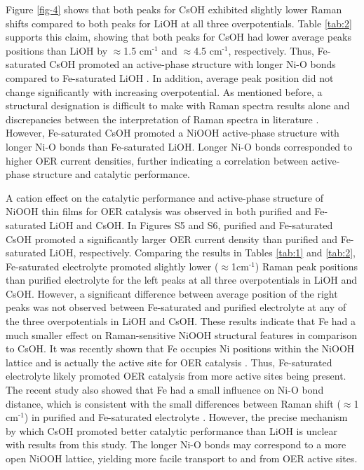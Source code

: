 \documentclass[journal=jpccck,manuscript=article,email=true]{achemso}
\begin{document}
Figure \ref{fig-4} shows that both peaks for CsOH exhibited slightly lower Raman shifts compared to both peaks for LiOH at all three overpotentials. Table \ref{tab:2} supports this claim, showing that both peaks for CsOH had lower average peaks positions than LiOH by $\approx$1.5 cm$^{\text{-1}}$ and $\approx$4.5 cm$^{\text{-1}}$, respectively. Thus, Fe-saturated CsOH promoted an active-phase structure with longer Ni-O bonds compared to Fe-saturated LiOH \cite{hardcastle-1990-deter-raman}. In addition, average peak position did not change significantly with increasing overpotential. As mentioned before, a structural designation is difficult to make with Raman spectra results alone and discrepancies between the interpretation of Raman spectra in literature \cite{cornilsen-1990-struc,yeo-2012-in-situ,louie-2013-inves-thin}. However, Fe-saturated CsOH promoted a NiOOH active-phase structure with longer Ni-O bonds than Fe-saturated LiOH. Longer Ni-O bonds corresponded to higher OER current densities, further indicating a correlation between active-phase structure and catalytic performance.

A cation effect on the catalytic performance and active-phase structure of NiOOH thin films for OER catalysis was observed in both purified and Fe-saturated LiOH and CsOH. In Figures S5 and S6, purified and Fe-saturated CsOH promoted a significantly larger OER current density than purified and Fe-saturated LiOH, respectively. Comparing the results in Tables \ref{tab:1} and \ref{tab:2}, Fe-saturated electrolyte promoted slightly lower ($\approx$1cm$^{\text{-1}}$) Raman peak positions than purified electrolyte for the left peaks at all three overpotentials in LiOH and CsOH. However, a significant difference between average position of the right peaks was not observed between Fe-saturated and purified electrolyte at any of the three overpotentials in LiOH and CsOH. These results indicate that Fe had a much smaller effect on Raman-sensitive NiOOH structural features in comparison to CsOH. It was recently shown that Fe occupies Ni positions within the NiOOH lattice and is actually the active site for OER catalysis \cite{friebel-2015-ident-highl}. Thus, Fe-saturated electrolyte likely promoted OER catalysis from more active sites being present. The recent study also showed that Fe had a small influence on Ni-O bond distance, which is consistent with the small differences between Raman shift ($\approx$1 cm$^{\text{-1}}$) in purified and Fe-saturated electrolyte \cite{friebel-2015-ident-highl}. However, the precise mechanism by which CsOH promoted better catalytic performance than LiOH is unclear with results from this study. The longer Ni-O bonds may correspond to a more open NiOOH lattice, yielding more facile transport to and from OER active sites.
\end{document}
